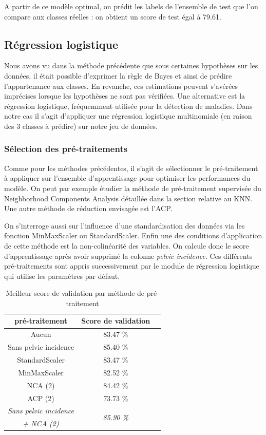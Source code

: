 \documentclass[twocolumn,10pt]{article}
\begin{document}
A partir de ce modèle optimal, on prédit les labels de l'ensemble de test que l'on compare aux classes réelles : on obtient un score de test égal à 79.61.

\subsection {Régression logistique}

Nous avons vu dans la méthode précédente que sous certaines hypothèses sur les données, il était possible d'exprimer la règle de Bayes et ainsi de prédire l'appartenance aux classes. En revanche, ces estimations peuvent s'avérées imprécises lorsque les hypothèses ne sont pas vérifiées. Une alternative est la régression logistique, fréquemment utilisée pour la détection de maladies. Dans notre cas il s'agit d'appliquer une régression logistique multinomiale (en raison des 3 classes à prédire) sur notre jeu de données.

\subsubsection{Sélection des pré-traitements}
Comme pour les méthodes précédentes, il s'agit de sélectionner le pré-traitement à appliquer sur l'ensemble d'apprentissage pour optimiser les performances du modèle. On peut par exemple étudier la méthode de pré-traitement supervisée du Neighborhood Components Analysis détaillée dans la section relative au KNN. Une autre méthode de réduction envisagée est l'ACP.

On s'interroge aussi sur l'influence d'une standardisation des données via les fonction MinMaxScaler ou StandardScaler. Enfin une des conditions d'application de cette méthode est la non-colinéarité des variables. On calcule donc le score d'apprentissage après avoir supprimé la colonne \textit{pelvic incidence}. Ces différents pré-traitements sont appris successivement par le module de régression logistique qui utilise les paramètres par défaut.

\begin{table}[htbp]
    \begin{center}
        \caption{\label{tab:accuracy_LogReg}Meilleur score de validation par méthode de pré-traitement}
        \begin{tabular}{c|cc}
            {pré-traitement} & Score de validation \\
            \hline 
            Aucun & 83.47 \%  \\
            Sans pelvic incidence & 85.40 \% \\
            StandardScaler & 83.47 \% \\
            MinMaxScaler & 82.52 \% \\
		    NCA (2) & 84.42 \% \\
			ACP (2) & 73.73 \% \\
			\textit{Sans pelvic incidence} & \multirow{2}{*}{\textit{85.90 \%}}  \\
            \textit{+ NCA (2)} & \\
        \end{tabular}
    \end{center}
\end{table}
\end{document}
